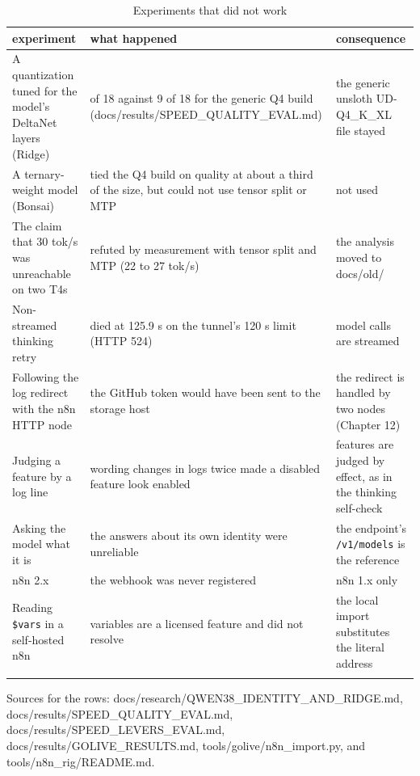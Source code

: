 \begingroup\small
\begin{longtable}{>{\raggedright\arraybackslash}p{0.287\dimexpr\linewidth-6\tabcolsep\relax}>{\raggedright\arraybackslash}p{0.425\dimexpr\linewidth-6\tabcolsep\relax}>{\raggedright\arraybackslash}p{0.287\dimexpr\linewidth-6\tabcolsep\relax}}
\toprule
\rowcolor{gray!14}\textbf{experiment} & \textbf{what happened} & \textbf{consequence} \\
\midrule
\endhead
\bottomrule
\endfoot
\endlastfoot
A quantization tuned for the model's DeltaNet layers (Ridge) & 5 of 18 against 9 of 18 for the generic Q4 build (docs/\allowbreak{}results/\allowbreak{}SPEED\_\allowbreak{}QUALITY\_\allowbreak{}EVAL.md) & the generic unsloth UD-Q4\_\allowbreak{}K\_\allowbreak{}XL file stayed \\
A ternary-weight model (Bonsai) & tied the Q4 build on quality at about a third of the size, but could not use tensor split or MTP & not used \\
The claim that 30 tok/\allowbreak{}s was unreachable on two T4s & refuted by measurement with tensor split and MTP (22 to 27 tok/\allowbreak{}s) & the analysis moved to docs/\allowbreak{}old/\allowbreak{} \\
Non-streamed thinking retry & died at 125.9 s on the tunnel's 120 s limit (HTTP 524) & model calls are streamed \\
Following the log redirect with the n8n HTTP node & the GitHub token would have been sent to the storage host & the redirect is handled by two nodes (Chapter 12) \\
Judging a feature by a log line & wording changes in logs twice made a disabled feature look enabled & features are judged by effect, as in the thinking self-check \\
Asking the model what it is & the answers about its own identity were unreliable & the endpoint's \texttt{/\allowbreak{}v1/\allowbreak{}models} is the reference \\
n8n 2.x & the webhook was never registered & n8n 1.x only \\
Reading \texttt{\$vars} in a self-hosted n8n & variables are a licensed feature and did not resolve & the local import substitutes the literal address \\
\bottomrule
\caption{Experiments that did not work}\label{tab:12acurren-1}\\
\end{longtable}
\endgroup

Sources for the rows: docs/\allowbreak{}research/\allowbreak{}QWEN38\_\allowbreak{}IDENTITY\_\allowbreak{}AND\_\allowbreak{}RIDGE.md, docs/\allowbreak{}results/\allowbreak{}SPEED\_\allowbreak{}QUALITY\_\allowbreak{}EVAL.md, docs/\allowbreak{}results/\allowbreak{}SPEED\_\allowbreak{}LEVERS\_\allowbreak{}EVAL.md, docs/\allowbreak{}results/\allowbreak{}GOLIVE\_\allowbreak{}RESULTS.md, tools/\allowbreak{}golive/\allowbreak{}n8n\_\allowbreak{}import.py, and tools/\allowbreak{}n8n\_\allowbreak{}rig/\allowbreak{}README.md.

